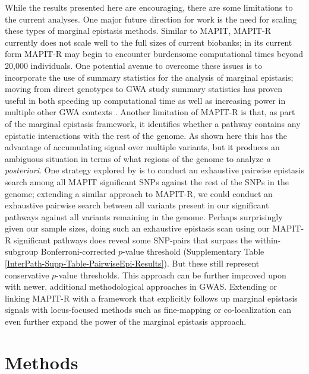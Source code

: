 \documentclass[12pt,a4paper]{article}
\begin{document}
While the results presented here are encouraging, there are some limitations to the current analyses. One major future direction for work is the need for scaling these types of marginal epistasis methods. Similar to MAPIT, MAPIT-R currently does not scale well to the full sizes of current biobanks; in its current form MAPIT-R may begin to encounter burdensome computational times beyond 20,000 individuals. One potential avenue to overcome these issues is to incorporate the use of summary statistics for the analysis of marginal epistasis; moving from direct genotypes to GWA study summary statistics has proven useful in both speeding up computational time as well as increasing power in multiple other GWA contexts \citep{Shi2016,Johnson2018,Ray2018,Turchin2019,Urbut2019,Cheng2020}. Another limitation of MAPIT-R is that, as part of the marginal epistasis framework, it identifies whether a pathway contains any epistatic interactions with the rest of the genome. As shown here this has the advantage of accumulating signal over multiple variants, but it produces an ambiguous situation in terms of what regions of the genome to analyze \textit{a posteriori}. One strategy explored by \citet{Crawford2017a} is to conduct an exhaustive pairwise epistasis search among all MAPIT significant SNPs against the rest of the SNPs in the genome; extending a similar approach to MAPIT-R, we could conduct an exhaustive pairwise search between all variants present in our significant pathways against all variants remaining in the genome. Perhaps surprisingly given our sample sizes, doing such an exhaustive epistasis scan using our MAPIT-R significant pathways does reveal some SNP-pairs that surpass the within-subgroup Bonferroni-corrected $p$-value threshold (Supplementary Table \ref{InterPath-Supp-Table-PairwiseEpi-Results}). But these still represent conservative $p$-value thresholds. This approach can be further improved upon with newer, additional methodological approaches in GWAS. Extending or linking MAPIT-R with a framework that explicitly follows up marginal epistasis signals with locus-focused methods such as fine-mapping \citep{Kichaev2014,Chen2015,Benner2016} or co-localization \citep{Hormozdiari2016,Zhu2016,Wen2017,Giambartolomei2018,Wallace2020} can even further expand the power of the marginal epistasis approach.  

\section{Methods}\label{InterPath-Online-Methods}
\end{document}
